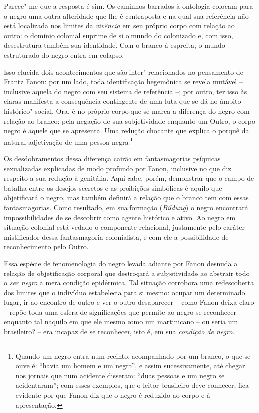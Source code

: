 Parece"-me que a resposta é sim.
Os caminhos barrados à ontologia
colocam para o negro uma outra alteridade que lhe é contraposta e na
qual sua referência não está localizada nos limites da \emph{vivência}
em seu próprio corpo com relação ao outro: o domínio colonial suprime de
si o mundo do colonizado e, com isso, desestrutura também sua
identidade. Com o branco à espreita, o mundo estruturado do negro entra
em colapso.

Isso elucida dois acontecimentos que são inter"-relacionados no
pensamento de Frantz Fanon: por um lado, toda identificação hegemônica
se revela mutável -- inclusive aquela do negro com seu sistema de
referência --; por outro, ter
isso às claras manifesta a consequência contingente de uma luta que se
dá no âmbito histórico"-social. Ora, é no próprio corpo que se marca a
diferença do negro com relação ao branco: pela negação de sua
subjetividade enquanto um Outro, o corpo negro é aquele que se
apresenta. Uma redução chocante que explica o porquê da natural
adjetivação de uma pessoa negra.\footnote{Quando um negro entra num
  recinto, acompanhado por um branco, o que se ouve é: ``havia um homem
  e um negro'', e assim sucessivamente, até chegar nos jornais que num
  acidente disseram: ``duas pessoas e um negro se acidentaram''; com
  esses exemplos, que o leitor brasileiro deve conhecer, fica evidente
  por que Fanon diz que o negro é reduzido ao corpo e à apresentação.}

Os desdobramentos dessa diferença cairão em fantasmagorias psíquicas
sexualizadas explicadas de modo profundo por Fanon, inclusive no que diz
respeito a sua redução à genitália. Aqui cabe, porém, demonstrar que o
campo de batalha entre os desejos secretos e as proibições simbólicas é
aquilo que objetificará o negro, mas também definirá a relação que o
branco tem com essas fantasmagorias. Como resultado, em sua formação
(\emph{Bildung}) o negro encontrará impossibilidades de se descobrir
como agente histórico e ativo. Ao negro em situação colonial está vedado
o componente relacional, justamente pelo caráter mistificador dessa
fantasmagoria colonialista, e com ele a possibilidade de reconhecimento
pelo Outro.

Essa espécie de fenomenologia do negro levada adiante por Fanon desnuda
a relação de objetificação corporal que destroçará a subjetividade ao
abstrair todo o \emph{ser negro} a mera condição epidérmica. Tal
situação corrobora uma redescoberta dos limites que o indivíduo
estabelecia para si mesmo: ocupar um determinado lugar, ir ao encontro
de outro e ver o outro desaparecer -- como Fanon deixa claro -- repõe toda
uma esfera de significações que permite ao negro se reconhecer enquanto
tal naquilo em que ele mesmo como um martinicano -- ou seria um
brasileiro? -- era incapaz de se reconhecer, isto é, em sua
\emph{condição de negro}.

